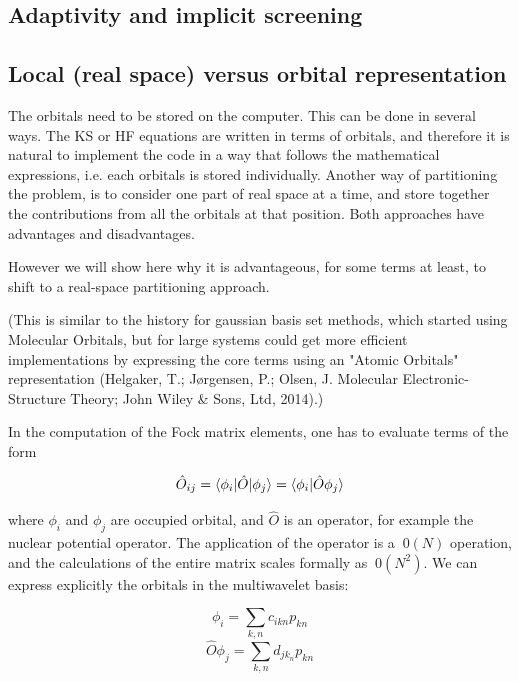 \documentclass{article}
\begin{document}
\subsection{Adaptivity and implicit screening}



\subsection{Local (real space) versus orbital representation}

The orbitals need to be stored on the computer. This can be done in several ways. The KS or HF equations are written in terms of orbitals, and therefore it is natural to implement the code in a way that follows the mathematical expressions, i.e. each orbitals is stored individually. Another way of partitioning the problem, is to consider one part of real space at a time, and store together the contributions from all the orbitals at that position. Both approaches have advantages and disadvantages.

However we will show here why it is advantageous, for some terms at least, to shift to a real-space partitioning approach.

(This is similar to the history for gaussian basis set methods, which started using Molecular Orbitals, but for large systems could get more efficient implementations by expressing the core terms using an "Atomic Orbitals" representation (Helgaker, T.; Jørgensen, P.; Olsen, J. Molecular Electronic-Structure Theory; John Wiley \& Sons, Ltd, 2014).)

In the computation of the Fock matrix elements, one has to evaluate terms of the form 

\begin{equation}
  {\hat O}_{ij} = \braket{\phi_i | {\hat O} |\phi_j}  = \braket{\phi_i | {\hat O} \phi_j} 
\end{equation}

where $\phi_i$ and $\phi_j$ are occupied orbital, and ${\hat O}$ is an operator, for example the nuclear potential operator. The application of the operator is a $~0(N)$ operation, and the calculations of the entire matrix scales formally as $~0(N^2)$. We can express explicitly the orbitals in the multiwavelet basis:

\begin{equation}
  \phi_i = \sum_{k,n} c_{ikn} p_{kn} 
\end{equation}
\begin{equation}
  {\hat O} \phi_j = \sum_{k,n} d_{jk_n} p_{kn} 
\end{equation}
\end{document}
